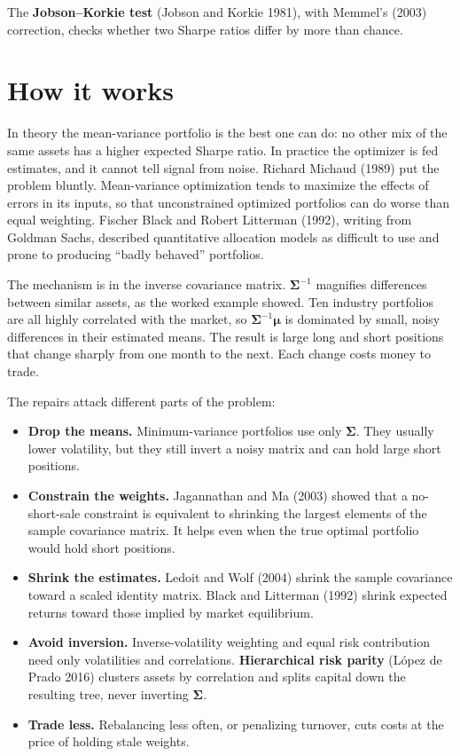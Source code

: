 The \textbf{Jobson--Korkie test} (Jobson and Korkie 1981), with Memmel's (2003) correction, checks whether two Sharpe ratios differ by more than chance.

\section{How it works}
\label{sec:19-how}

In theory the mean-variance portfolio is the best one can do: no other mix of the same assets has a higher expected Sharpe ratio. In practice the optimizer is fed estimates, and it cannot tell signal from noise. Richard Michaud (1989) put the problem bluntly. Mean-variance optimization tends to maximize the effects of errors in its inputs, so that unconstrained optimized portfolios can do worse than equal weighting. Fischer Black and Robert Litterman (1992), writing from Goldman Sachs, described quantitative allocation models as difficult to use and prone to producing ``badly behaved'' portfolios.

The mechanism is in the inverse covariance matrix. $\boldsymbol{\Sigma}^{-1}$ magnifies differences between similar assets, as the worked example showed. Ten industry portfolios are all highly correlated with the market, so $\boldsymbol{\Sigma}^{-1}\boldsymbol{\mu}$ is dominated by small, noisy differences in their estimated means. The result is large long and short positions that change sharply from one month to the next. Each change costs money to trade.

The repairs attack different parts of the problem:

\begin{itemize}
  \item \textbf{Drop the means.} Minimum-variance portfolios use only $\boldsymbol{\Sigma}$. They usually lower volatility, but they still invert a noisy matrix and can hold large short positions.
  \item \textbf{Constrain the weights.} Jagannathan and Ma (2003) showed that a no-short-sale constraint is equivalent to shrinking the largest elements of the sample covariance matrix. It helps even when the true optimal portfolio would hold short positions.
  \item \textbf{Shrink the estimates.} Ledoit and Wolf (2004) shrink the sample covariance toward a scaled identity matrix. Black and Litterman (1992) shrink expected returns toward those implied by market equilibrium.
  \item \textbf{Avoid inversion.} Inverse-volatility weighting and equal risk contribution need only volatilities and correlations. \textbf{Hierarchical risk parity} (L\'opez de Prado 2016) clusters assets by correlation and splits capital down the resulting tree, never inverting $\boldsymbol{\Sigma}$.
  \item \textbf{Trade less.} Rebalancing less often, or penalizing turnover, cuts costs at the price of holding stale weights.
\end{itemize}

